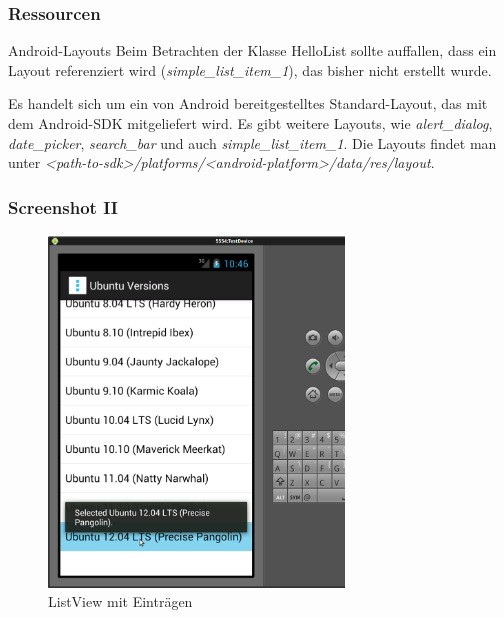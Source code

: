 \begin{frame}
   \frametitle{Ressourcen}

   \begin{alertblock}{Android-Layouts}
		Beim Betrachten der Klasse HelloList sollte auffallen, dass ein Layout 
		referenziert wird (\emph{simple\_list\_item\_1}), das bisher nicht erstellt wurde.

		\vspace{5mm}

		Es handelt sich um ein von Android bereitgestelltes Standard-Layout, 
		das mit dem Android-SDK mitgeliefert wird. Es gibt weitere Layouts, wie \emph{alert\_dialog}, 
		\emph{date\_picker}, \emph{search\_bar} und auch \emph{simple\_list\_item\_1}. 
		Die Layouts findet man unter \emph{\textless{}path-to-sdk\textgreater{}/platforms/\textless{}android-platform\textgreater{}/data/res/layout}.
   \end{alertblock}
\end{frame}

\begin{frame}
   \frametitle{Screenshot II}
   \begin{figure}[h!]
     \centering
     \includegraphics[width=0.7\textwidth]{pictures/hello_list.ps}
     \caption{
        ListView mit Einträgen
     }
     \label{fig:hello_list}
   \end{figure}
\end{frame}

